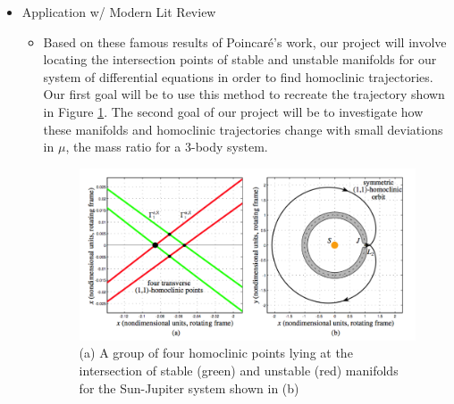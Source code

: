 \documentclass{article}
\begin{document}
\begin{itemize}
\begin{itemize}
	  \end{itemize}
	\item Application w/ Modern Lit Review
	  \begin{itemize}
	  	\item Based on these famous results of Poincaré's work, our project will involve locating the intersection points of stable and unstable manifolds for our system of differential equations in order to find homoclinic trajectories. Our first goal will be to use this method to recreate the trajectory shown in Figure \ref{fig:homoclinicPoints}. The second goal of our project will be to investigate how these manifolds and homoclinic trajectories change with small deviations in $\mu$, the mass ratio for a 3-body system.
	  	\begin{figure}
	  	\centering
	  	\includegraphics[scale=0.4]{homoclinicPoints.png}\nonumber
	  	\caption{(a) A group of four homoclinic points lying at the intersection of stable (green) and unstable (red) manifolds for the Sun-Jupiter system shown in (b) \cite{KoonLoMarsdenRoss2011}}
		\label{fig:homoclinicPoints}
	  	\end{figure}
	  \end{itemize}
\end{itemize}



\end{document}
